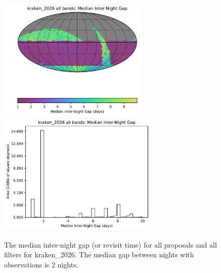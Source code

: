 \documentclass[DM,authoryear,toc]{lsstdoc}
\begin{document}
\begin{figure}[htb]
\centering
\vskip -0.0in
\includegraphics[height=2.3in]{figures/kraken_2026_Median_Inter-Night_Gap_all_bands_HEAL_SkyMap.pdf}
\includegraphics[height=2.3in]{figures/kraken_2026_Median_Inter-Night_Gap_all_bands_HEAL_Histogram.pdf}
\vskip -0.1in
\caption{The median inter-night gap (or revisit time)  for all proposals and all filters for kraken\_2026.
The median gap between nights with observations is 2 nights.
\label{fig:baseline_GapAll}}
\end{figure}
\end{document}
